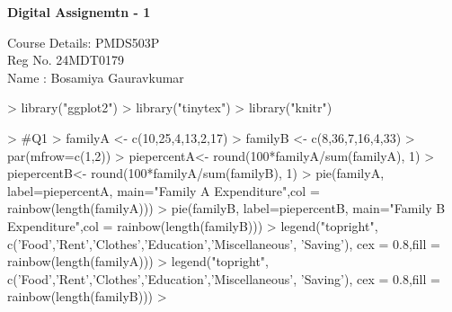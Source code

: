 \documentclass{article}
\begin{document}

\begin{center}
\Large{\textbf{Digital Assignemtn - 1}}
\newline

Course Details: PMDS503P  \\
Reg No. 24MDT0179 \\
Name : Bosamiya Gauravkumar \\
\end{center}

\begin{Schunk}
\begin{Sinput}
> library("ggplot2")
> library("tinytex")
> library("knitr")
\end{Sinput}
\end{Schunk}

\begin{Schunk}
\begin{Sinput}
> #Q1
> familyA <- c(10,25,4,13,2,17)
> familyB <- c(8,36,7,16,4,33)
> par(mfrow=c(1,2))
> piepercentA<- round(100*familyA/sum(familyA), 1)
> piepercentB<- round(100*familyA/sum(familyB), 1)
> pie(familyA, label=piepercentA, main="Family A Expenditure",col = rainbow(length(familyA))) 
> pie(familyB, label=piepercentB, main="Family B Expenditure",col = rainbow(length(familyB)))
> legend("topright", c('Food','Rent','Clothes','Education','Miscellaneous', 'Saving'), cex = 0.8,fill = rainbow(length(familyA)))
> legend("topright", c('Food','Rent','Clothes','Education','Miscellaneous', 'Saving'), cex = 0.8,fill = rainbow(length(familyB)))
> 
\end{Sinput}
\end{Schunk}
\newpage
\end{document}
